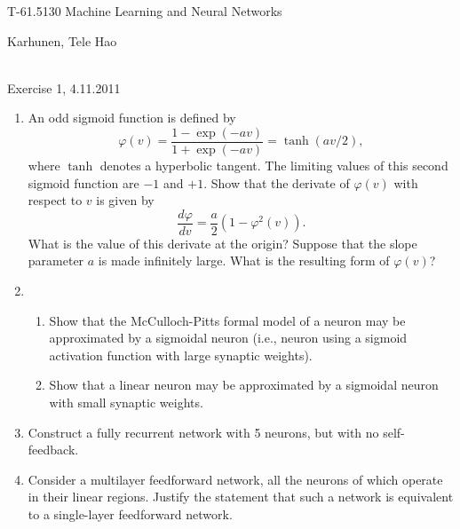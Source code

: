\documentclass[10pt]{article}
\begin{document}
\pagestyle{empty}
\begin{Large}
\begin{bf} 
T-61.5130 Machine Learning and Neural Networks\\ 
\end{bf}
\end{Large}
Karhunen, Tele Hao\\  
\\
\begin{large}
\begin{bf}
Exercise 1,  4.11.2011
\end{bf}
\end{large}
\begin{enumerate}

\item An odd sigmoid function is defined by
\begin{equation*}
\varphi(v)=\frac{1-\exp(-av)}{1+\exp(-av)}=\tanh(av/2),
\end{equation*}
where $\tanh$ denotes a hyperbolic tangent. The limiting values of
this second sigmoid function are $-1$ and $+1$. Show that the derivate 
of $\varphi(v)$ with respect to $v$ is given by
\begin{equation*}
\frac{d\varphi}{dv}=\frac{a}{2}(1-\varphi^2(v)).
\end{equation*}
What is the value of this derivate at the origin? Suppose that the
slope parameter $a$ is made infinitely large. What is the resulting
form of $\varphi(v)$?

\item 
\begin{enumerate} \item Show that the McCulloch-Pitts formal model of
a neuron may be approximated by a sigmoidal neuron (i.e., neuron using 
a sigmoid activation function with large synaptic weights). 
\item Show that a linear neuron may be approximated by a sigmoidal
neuron with small synaptic weights. 
\end{enumerate}

\item Construct a fully recurrent network with 5 neurons, but with no
self-feedback. 


\item Consider a multilayer feedforward network, all the neurons of
which operate in their linear regions. Justify the statement that such 
a network is equivalent to a single-layer feedforward network. 


\end{enumerate}
\end{document}
